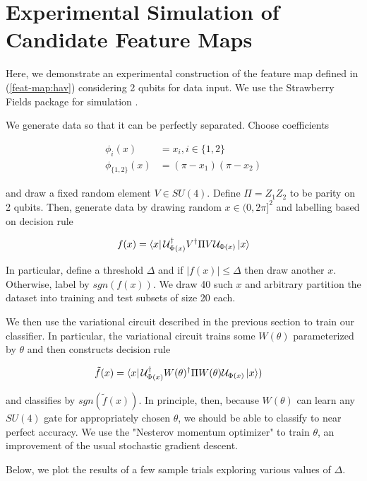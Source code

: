 \documentclass[main.tex]{subfiles}
\begin{document}
\section{Experimental Simulation of Candidate Feature Maps}

Here, we demonstrate an experimental construction of the feature map defined in (\ref{feat-map:hav}) considering 2 qubits for data input. We use the Strawberry Fields package for simulation \cite{killoran2019strawberry}.

We generate data so that it can be perfectly separated. Choose coefficients

\begin{align*}
\phi_{i}(x) &= x_i, i \in \{1, 2\} \\
\phi_{\{1,2\}}(x) &= (\pi - x_1)(\pi - x_2) 
\end{align*}

and draw a fixed random element $V \in SU(4)$. Define $\Pi = Z_1Z_2$ to be parity on 2 qubits. Then, generate data by drawing random $x \in (0, 2\pi]^2$ and labelling based on decision rule

\begin{align*}
f(x) = \bra{x} \mathcal{U}_{\Phi(x)}^\dag V^\dag \Pi V \mathcal{U}_{\Phi(x)}\ket{x}	 
\end{align*}

In particular, define a threshold $\Delta$ and if $|f(x)| \leq \Delta$ then draw another $x$. Otherwise, label by $sgn(f(x))$. We draw 40 such $x$ and arbitrary partition the dataset into training and test subsets of size 20 each.
 
We then use the variational circuit described in the previous section to train our classifier. In particular, the variational circuit trains some $W(\theta)$ parameterized by $\theta$ and then constructs decision rule

\begin{align*}
\tilde{f}(x) &= \bra{x} \mathcal{U}_{\Phi(x)}^\dag W(\theta)^\dag \Pi W(\theta) \mathcal{U}_{\Phi(x)}\ket{x})
\end{align*}
 
and classifies by $sgn(\tilde{f}(x))$. In principle, then, because $W(\theta)$ can learn any $SU(4)$ gate for appropriately chosen $\theta$, we should be able to classify to near perfect accuracy. We use the "Nesterov momentum optimizer" to train $\theta$, an improvement of the usual stochastic gradient descent.

Below, we plot the results of a few sample trials exploring various values of $\Delta$.
\end{document}
